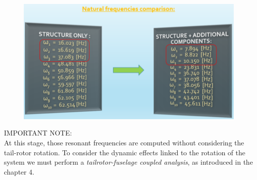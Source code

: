 \begin{figure}[h!]
	\begin{center}
		\centering  		 		
		\includegraphics[width=0.70\linewidth]{PICTURES/2_Lama_truss/PNG/model2/comparison.png}
	\end{center}
\end{figure}

\smallskip
\noindent
IMPORTANT NOTE: \\
At this stage, those resonant frequencies are computed without considering the tail-rotor rotation. To consider the dynamic effects linked to the rotation of the system we must perform a \emph{tailrotor-fuselage coupled analysis}, as introduced in the chapter 4. \\ 






















\clearpage
\bigskip